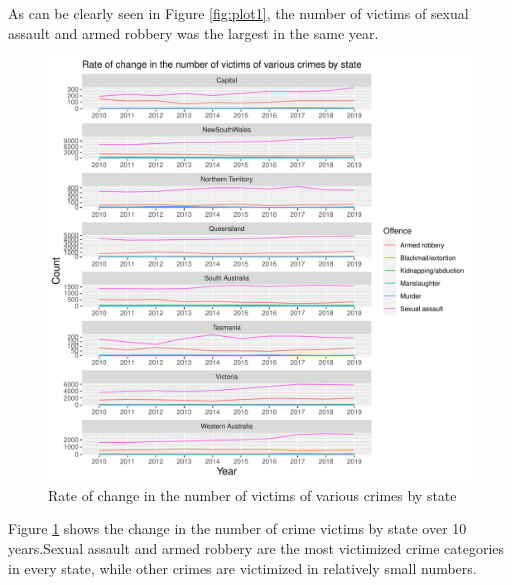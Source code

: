 \documentclass[11pt,a4paper,]{article}
\begin{document}
As can be clearly seen in Figure \ref{fig:plot1}, the number of victims of sexual assault and armed robbery was the largest in the same year.

\begin{figure}
\centering
\includegraphics{report_files/figure-latex/plot2-1.pdf}
\caption{\label{fig:plot2}Rate of change in the number of victims of various crimes by state}
\end{figure}

Figure \ref{fig:plot2} shows the change in the number of crime victims by state over 10 years.Sexual assault and armed robbery are the most victimized crime categories in every state, while other crimes are victimized in relatively small numbers.
\end{document}
